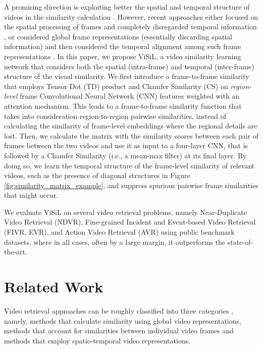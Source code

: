 \documentclass[10pt,twocolumn,letterpaper]{article}
\begin{document}
A promising direction is exploiting better the spatial and temporal structure of videos in the similarity calculation \cite{douze2010, jiang2014, jiang2016}. However, recent approaches either focused on the spatial processing of frames and completely disregarded temporal information \cite{gao2017, kordopatis2017b}, or considered global frame representations (essentially discarding spatial information) and then considered the temporal alignment among such frame representations \cite{chou2015,baraldi2018}. 
In this paper, we propose ViSiL, a video similarity learning network that considers both the spatial (intra-frame) and temporal (inter-frame) structure of the visual similarity. We first introduce a frame-to-frame similarity that employs Tensor Dot (TD) product and Chamfer Similarity (CS) on {\it region-level} frame Convolutional Neural Network (CNN) features weighted with an attention mechanism. This leads to a frame-to-frame similarity function that takes into consideration region-to-region pairwise similarities, instead of calculating the similarity of frame-level embeddings where the regional details are lost. Then, we calculate the matrix with the similarity scores between each pair of frames between the two videos and use it as input to a four-layer CNN, that is followed by a Chamfer Similarity (i.e., a mean-max filter) at its final layer. By doing so, we learn the temporal structure of the frame-level similarity of relevant videos, such as the presence of diagonal structures in Figure \ref{fig:similarity_matrix_example}, and suppress spurious pairwise frame similarities that might occur.






We evaluate ViSiL on several video retrieval problems, namely Near-Duplicate Video Retrieval (NDVR), Fine-grained Incident and Event-based Video Retrieval (FIVR, EVR), and Action Video Retrieval (AVR) using public benchmark datasets, where in all cases, often by a large margin, it outperforms the state-of-the-art.







\section{Related Work}

Video retrieval approaches can be roughly classified into three categories \cite{liu2013}, namely, methods that calculate similarity using global video representations, methods that account for similarities between individual video frames and methods that employ spatio-temporal video representations.
\end{document}
